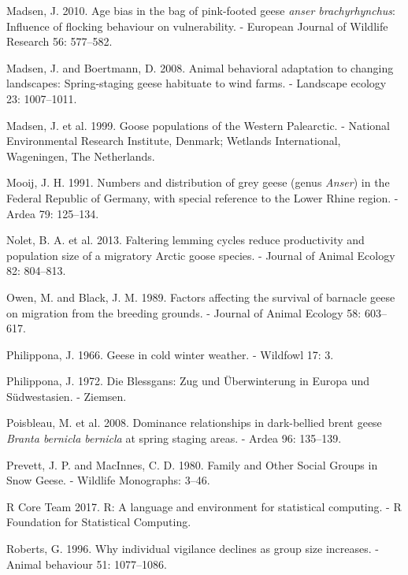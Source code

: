 \documentclass[10pt,twocolumn]{paper}
\begin{document}
\hypertarget{ref-Madsen2010}{}
Madsen, J. 2010. Age bias in the bag of pink-footed geese \emph{anser
brachyrhynchus}: Influence of flocking behaviour on vulnerability. -
European Journal of Wildlife Research 56: 577--582.

\hypertarget{ref-madsen2008animal}{}
Madsen, J. and Boertmann, D. 2008. Animal behavioral adaptation to
changing landscapes: Spring-staging geese habituate to wind farms. -
Landscape ecology 23: 1007--1011.

\hypertarget{ref-madsen1999goose}{}
Madsen, J. et al. 1999. Goose populations of the Western Palearctic. -
National Environmental Research Institute, Denmark; Wetlands
International, Wageningen, The Netherlands.

\hypertarget{ref-mooij1991numbers}{}
Mooij, J. H. 1991. Numbers and distribution of grey geese (genus
\emph{Anser}) in the Federal Republic of Germany, with special reference
to the Lower Rhine region. - Ardea 79: 125--134.

\hypertarget{ref-nolet2013faltering}{}
Nolet, B. A. et al. 2013. Faltering lemming cycles reduce productivity
and population size of a migratory Arctic goose species. - Journal of
Animal Ecology 82: 804--813.

\hypertarget{ref-owen1989survival}{}
Owen, M. and Black, J. M. 1989. Factors affecting the survival of
barnacle geese on migration from the breeding grounds. - Journal of
Animal Ecology 58: 603--617.

\hypertarget{ref-philippona1966geese}{}
Philippona, J. 1966. Geese in cold winter weather. - Wildfowl 17: 3.

\hypertarget{ref-philippona1972blessgans}{}
Philippona, J. 1972. Die Blessgans: Zug und Überwinterung in Europa und
Südwestasien. - Ziemsen.

\hypertarget{ref-poisbleau2008dominance}{}
Poisbleau, M. et al. 2008. Dominance relationships in dark-bellied brent
geese \emph{Branta bernicla bernicla} at spring staging areas. - Ardea
96: 135--139.

\hypertarget{ref-prevett1980snow}{}
Prevett, J. P. and MacInnes, C. D. 1980. Family and Other Social Groups
in Snow Geese. - Wildlife Monographs: 3--46.

\hypertarget{ref-R}{}
R Core Team 2017. R: A language and environment for statistical
computing. - R Foundation for Statistical Computing.

\hypertarget{ref-roberts1996individual}{}
Roberts, G. 1996. Why individual vigilance declines as group size
increases. - Animal behaviour 51: 1077--1086.
\end{document}

